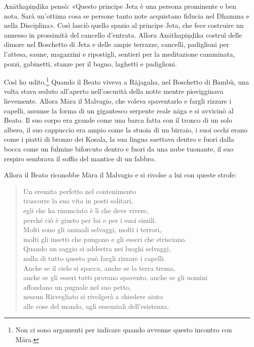 Anāthapiṇḍika pensò: «Questo principe Jeta è una persona prominente e ben nota.
Sarà un’ottima cosa se persone tanto note acquistano fiducia nel Dhamma e nella
Disciplina». Così lasciò quello spazio al principe Jeta, che fece costruire un
annesso in prossimità del cancello d’entrata. Allora Anāthapiṇḍika costruì delle
dimore nel Boschetto di Jeta e delle ampie terrazze, cancelli, padiglioni per
l’attesa, saune, magazzini e ripostigli, sentieri per la meditazione camminata,
pozzi, gabinetti, stanze per il bagno, laghetti e padiglioni.


 Così ho udito.\footnote{Non ci sono argomenti per indicare
  quando avvenne questo incontro con Māra.} Quando il Beato viveva a Rājagaha,
nel Boschetto di Bambù, una volta stava seduto all’aperto nell’oscurità della
notte mentre piovigginava lievemente. Allora Māra il Malvagio, che voleva
spaventarlo e fargli rizzare i capelli, assunse la forma di un gigantesco
serpente reale nāga e si avvicinò al Beato. Il suo corpo era grande come una
barca fatta con il tronco di un solo albero, il suo cappuccio era ampio come la
stuoia di un birraio, i suoi occhi erano come i piatti di bronzo dei Kosala, la
sua lingua saettava dentro e fuori dalla bocca come un fulmine biforcuto dentro
e fuori da una nube tuonante, il suo respiro sembrava il soffio del mantice di
un fabbro.

Allora il Beato riconobbe Māra il Malvagio e si rivolse a lui con queste strofe:

\begin{quote}
Un eremita perfetto nel contenimento \\
trascorre la sua vita in posti solitari, \\
egli che ha rinunciato è lì che deve vivere, \\
perché ciò è giusto per lui e per i suoi simili. \\
Molti sono gli animali selvaggi, molti i terrori, \\
molti gli insetti che pungono e gli esseri che strisciano. \\
Quando un saggio si addestra nei luoghi selvaggi, \\
nulla di tutto questo può fargli rizzare i capelli. \\
Anche se il cielo si spacca, anche se la terra trema, \\
anche se gli esseri tutti provano spavento, anche se gli uomini \\
affondano un pugnale nel suo petto, \\
nessun Risvegliato si rivolgerà a chiedere aiuto \\
alle cose del mondo, agli essenziali dell’esistenza.
\end{quote}

